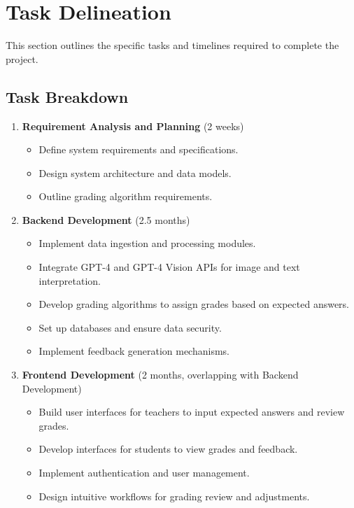 \documentclass[ms,twoside,print]{nuthesis}
\begin{document}
\section{Task Delineation}

This section outlines the specific tasks and timelines required to complete the project.

\subsection{Task Breakdown}

\begin{enumerate}
    \item \textbf{Requirement Analysis and Planning} (2 weeks)
    \begin{itemize}
        \item Define system requirements and specifications.
        \item Design system architecture and data models.
        \item Outline grading algorithm requirements.
    \end{itemize}
    \item \textbf{Backend Development} (2.5 months)
    \begin{itemize}
        \item Implement data ingestion and processing modules.
        \item Integrate GPT-4 and GPT-4 Vision APIs for image and text interpretation.
        \item Develop grading algorithms to assign grades based on expected answers.
        \item Set up databases and ensure data security.
        \item Implement feedback generation mechanisms.
    \end{itemize}
    \item \textbf{Frontend Development} (2 months, overlapping with Backend Development)
    \begin{itemize}
        \item Build user interfaces for teachers to input expected answers and review grades.
        \item Develop interfaces for students to view grades and feedback.
        \item Implement authentication and user management.
        \item Design intuitive workflows for grading review and adjustments.
    \end{itemize}

\end{enumerate}
\end{document}
